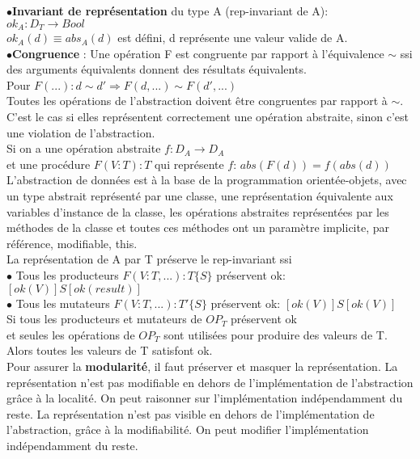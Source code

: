 $\bullet$\textbf{Invariant de représentation} du type A (rep-invariant de A):\\
$ok_A: D_T \rightarrow Bool$\\
$ok_A(d) \equiv abs_A(d)$ est défini, d représente une valeur valide de A.\\ 


$\bullet$\textbf{Congruence} : Une opération F est congruente par rapport à l'équivalence $\sim$ ssi des arguments équivalents donnent des résultats équivalents.\\
Pour $F(...) : d \sim d' \Rightarrow F(d,...) \sim F(d',...)$\\
Toutes les opérations de l'abstraction doivent être congruentes par rapport à $\sim$. C'est le cas si elles représentent correctement une opération abstraite, sinon c'est une violation de l'abstraction.\\
Si on a une opération abstraite $f:D_A \rightarrow D_A$\\ et une procédure $F(V:T):T$ qui représente $f$: $abs(F(d))=f(abs(d))$\\

L'abstraction de données est à la base de la programmation orientée-objets, avec un type abstrait représenté par une classe, une représentation équivalente aux variables d'instance de la classe, les opérations abstraites représentées par les méthodes de la classe et toutes ces méthodes ont un paramètre implicite, par référence, modifiable, this.\\

La représentation de A par T préserve le rep-invariant ssi\\
$\bullet$ Tous les producteurs $F(V:T,...):T\{S\}$ préservent ok: $[ok(V)]S[ok(result)]$\\
$\bullet$ Tous les mutateurs $F(V:T,...):T'\{S\}$ préservent ok: $[ok(V)]S[ok(V)]$\\
Si tous les producteurs et mutateurs de $OP_T$ préservent ok\\
et seules les opérations de $OP_T$ sont utilisées pour produire des valeurs de T.\\
Alors toutes les valeurs de T satisfont ok.\\

Pour assurer la \textbf{modularité}, il faut préserver et masquer la représentation. La représentation n'est pas modifiable en dehors de l'implémentation de l'abstraction grâce à la localité. On peut raisonner sur l'implémentation indépendamment du reste. La représentation n'est pas visible en dehors de l'implémentation de l'abstraction, grâce à la modifiabilité. On peut modifier l'implémentation indépendamment du reste.\\

